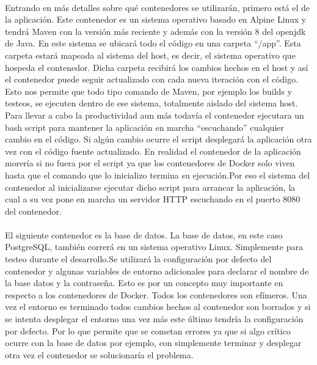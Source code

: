 \paragraph{}
Entrando en más detalles sobre qué contenedores se utilizarán, primero está el de la aplicación. Este contenedor es un sistema operativo basado en Alpine Linux y tendrá Maven con la versión más reciente y además con la versión 8 del openjdk de Java. En este sistema se ubicará todo el código en una carpeta “/app”. Esta carpeta estará mapeada al sistema del host, es decir, el sistema operativo que hospeda el contenedor. Dicha carpeta recibirá los cambios hechos en el host y así el contenedor puede seguir actualizado con cada nueva iteración con el código. Esto nos permite que todo tipo comando de Maven, por ejemplo los builds y testeos,  se ejecuten dentro de ese sistema, totalmente aislado del sistema host.
Para llevar a cabo la productividad aun más todavía el contenedor ejecutara un bash script para mantener la aplicación en marcha “escuchando” cualquier cambio en el código. Si algún cambio ocurre el script desplegará la aplicación otra vez con el código fuente actualizado. En realidad el contenedor de la aplicación morería si no fuera por el script ya que los contenedores de Docker solo viven hasta que el comando que lo inicializo termina su ejecución.Por eso el sistema del contenedor al inicializarse ejecutar dicho script para arrancar la aplicación, la cual a su vez pone en marcha un servidor HTTP escuchando en el puerto 8080 del contenedor.

\paragraph{}
El siguiente contenedor es la base de datos. La base de datos, en este caso PostgreSQL, también correrá en un sistema operativo Linux. Simplemente para testeo durante el desarrollo.Se utilizará la configuración por defecto del contenedor y algunas variables de entorno adicionales para declarar el nombre de la base datos y la contraseña. Esto es por un concepto muy importante en respecto a los contenedores de Docker. Todos los contenedores son efímeros. Una vez el entorno es terminado todos cambios hechos al contenedor son borrados y si se intenta desplegar el entorno una vez más este último tendría la configuración por defecto. Por lo que permite que se cometan errores ya que si algo crítico ocurre con la base de datos por ejemplo, con simplemente terminar y desplegar otra vez el contenedor se solucionaría el problema.

